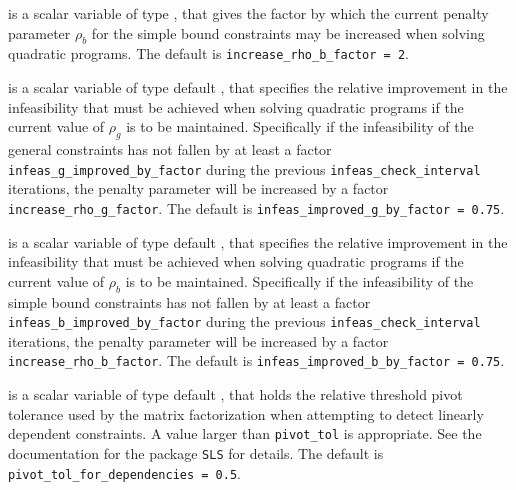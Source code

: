 \begin{description}
 is a scalar variable of type \realdp,
that gives the factor by which the current penalty parameter $\rho_b$ for
the simple bound constraints may be increased when solving quadratic programs.
The default is {\tt increase\_rho\_b\_factor = 2}.

 is a scalar variable of type default
\realdp, that specifies the relative improvement in the infeasibility
that must be achieved when solving quadratic programs if the current
value of $\rho_g$ is to be maintained.
Specifically if the infeasibility of the general constraints
has not fallen by at least a factor {\tt infeas\_g\_improved\_by\_factor}
during the previous {\tt infeas\_check\_interval} iterations, the
penalty parameter will be increased by a factor
{\tt increase\_rho\_g\_factor}.
The default is {\tt infeas\_im\-proved\_g\_by\_factor = 0.75}.

 is a scalar variable of type default
\realdp, that specifies the relative improvement in the infeasibility
that must be achieved when solving quadratic programs if the current
value of $\rho_b$ is to be maintained.
Specifically if the infeasibility of the simple bound constraints
has not fallen by at least a factor {\tt infeas\_b\_improved\_by\_factor}
during the previous {\tt infeas\_check\_in\-terval} iterations, the
penalty parameter will be increased by a factor
{\tt increase\_rho\_b\_factor}.
The default is {\tt infeas\_im\-proved\_b\_by\_factor = 0.75}.


 is a scalar variable of type default
\realdp, that holds the relative
threshold pivot  tolerance used by the matrix factorization when
attempting to detect linearly dependent constraints. A value larger
than  {\tt pivot\_tol} is appropriate. See
the documentation for the package {\tt SLS} for details.
The default is {\tt pivot\_tol\_for\_dependencies = 0.5}.



\end{description}
